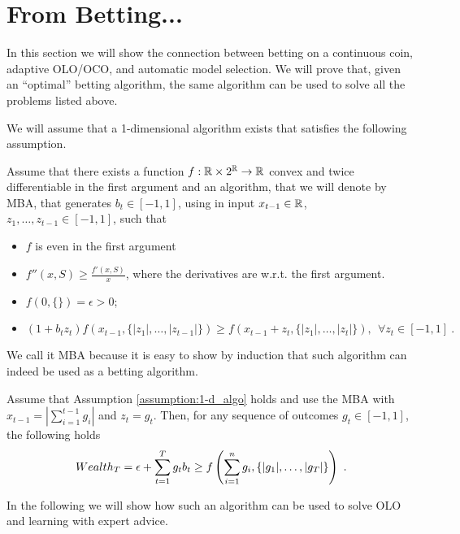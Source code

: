\section{From Betting...}

In this section we will show the connection between betting on a continuous coin, adaptive \ac{OLO}/\ac{OCO}, and automatic model selection. We will prove that, given an ``optimal'' betting algorithm, the same algorithm can be used to solve all the problems listed above.

We will assume that a 1-dimensional algorithm exists that satisfies the following assumption.
\begin{assumption}
\label{assumption:1-d_algo}
Assume that there exists a function $f:\mathbb{R} \times 2^{\mathbb{R}} \rightarrow \mathbb{R}$ convex and twice differentiable in the first argument and an algorithm, that we will denote by \ac{MBA}, that generates $b_t \in [-1 , 1]$, using in input $x_{t-1} \in \mathbb{R}$, $z_1, \ldots, z_{t-1} \in [-1,1]$, such that
\begin{itemize}
\item $f$ is even in the first argument
\item $f''(x, S) \geq \frac{f'(x,S)}{x}$, where the derivatives are w.r.t. the first argument.
\item $f(0,\{\})=\epsilon>0$;
\item  \begin{equation}
\label{eq:1_d_hp}
(1+b_t z_t) f\left( x_{t-1}, \{|z_1|, \ldots, |z_{t-1}|\} \right) \geq f\left( x_{t-1}+z_t, \{|z_1|, \ldots, |z_t|\}\right), \ \ \forall z_{t} \in [-1,1]~.
\end{equation}
\end{itemize}
\end{assumption}

We call it \ac{MBA} because it is easy to show by induction that such algorithm can indeed be used as a betting algorithm.
\begin{theorem}
\label{theo:1-d_reward}
Assume that Assumption \ref{assumption:1-d_algo} holds and use the \ac{MBA} with $x_{t-1}=|\sum_{i=1}^{t-1} g_i|$ and $z_t=g_t$.
Then, for any sequence of outcomes $g_t \in [-1,1]$, the following holds
\[
Wealth_T = \epsilon+\sum_{t=1}^T g_t b_t \geq f\left( \sum_{i=1}^{n} g_i , \left\{|g_1|, \ldots, |g_T|\right\}\right)~.
\]
\end{theorem}

In the following we will show how such an algorithm can be used to solve \ac{OLO} and learning with expert advice.

